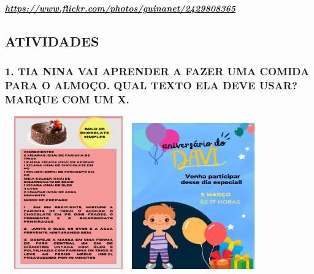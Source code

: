 \href{https://www.flickr.com/photos/guinanet/2429808365}{\textbf{\emph{https://www.flickr.com/photos/guinanet/2429808365}}}



\subsection{ATIVIDADES}\label{atividades-3}

\subsubsection{1. TIA NINA VAI APRENDER A FAZER UMA COMIDA PARA O ALMOÇO.
QUAL TEXTO ELA DEVE USAR? MARQUE COM UM
X.}\label{tia-nina-vai-aprender-fazer-uma-comida-para-o-almouxe7o.-qual-texto-ela-deve-usar-marque-com-um-x.}

\includegraphics[width=2.15625in,height=2.60417in]{media/image137.png}\includegraphics[width=2.08333in,height=2.49514in]{media/image138.png}

